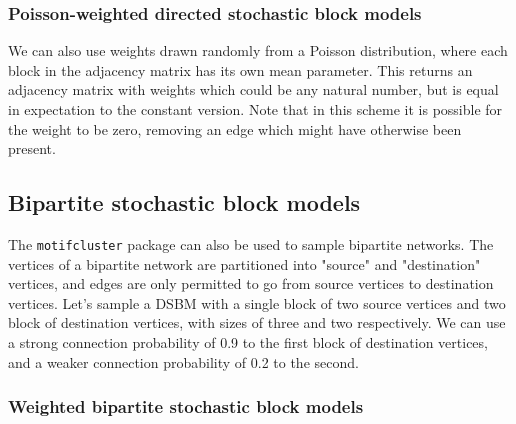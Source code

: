 \documentclass{article}
\begin{document}
\begin{pyconsole}
\end{pyconsole}

\subsubsection{Poisson-weighted directed stochastic block models}

We can also use weights drawn randomly from a Poisson distribution,
where each block in the adjacency matrix has its own mean parameter.
This returns an adjacency matrix with weights which could be any natural
number, but is equal in expectation to the constant version.
Note that in this scheme it is possible for the weight to be zero,
removing an edge which might have otherwise been present.

\begin{pyconsole}
\end{pyconsole}

\subsection{Bipartite stochastic block models}

The \texttt{motifcluster} package can also be used to sample
bipartite networks.
The vertices of a bipartite network are partitioned
into "source" and "destination" vertices,
and edges are only permitted to go from source vertices
to destination vertices.
Let's sample a DSBM with a single block of two source vertices
and two block of destination vertices, with
sizes of three and two respectively.
We can use a strong connection probability of 0.9 to the first block of
destination vertices,
and a weaker connection probability of 0.2 to the second.

\begin{pyconsole}
\end{pyconsole}

\subsubsection{Weighted bipartite stochastic block models}
\end{document}

